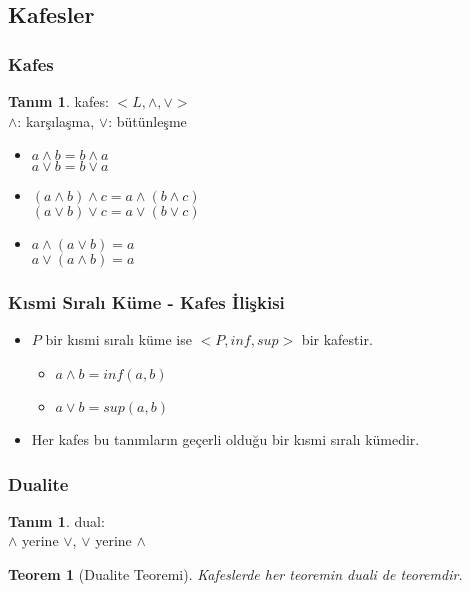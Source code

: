 \documentclass[dvipsnames]{beamer}
\theoremstyle{definition}
\newtheorem{tanim}[theorem]{Tanım}
\theoremstyle{example}
\theoremstyle{plain}
\newtheorem{teorem}[theorem]{Teorem}
\begin{document}
\subsection{Kafesler}

\begin{frame}
  \frametitle{Kafes}

  \begin{tanim}
    \alert{kafes}: $<L,\wedge,\vee>$\\
    $\wedge$: karşılaşma, $\vee$: bütünleşme

    \pause
    \begin{itemize}
      \item $a \wedge b = b \wedge a$\\
        $a \vee b = b \vee a$
      \item$(a \wedge b) \wedge c = a \wedge (b \wedge c)$\\
        $(a \vee b) \vee c = a \vee (b \vee c)$
      \item $a \wedge (a \vee b) = a$\\
        $a \vee (a \wedge b) = a$
    \end{itemize}
  \end{tanim}
\end{frame}

\begin{frame}
  \frametitle{Kısmi Sıralı Küme - Kafes İlişkisi}

  \begin{itemize}
    \item $P$ bir kısmi sıralı küme ise $<P,inf,sup>$ bir kafestir.
    \begin{itemize}
      \item $a \wedge b = inf(a,b)$
      \item $a \vee b = sup(a,b)$
    \end{itemize}

    \pause
    \medskip
    \item Her kafes bu tanımların geçerli olduğu bir kısmi sıralı kümedir.
  \end{itemize}
\end{frame}

\begin{frame}
  \frametitle{Dualite}

  \begin{tanim}
    \alert{dual}:\\
    $\wedge$ yerine $\vee$, $\vee$ yerine $\wedge$
  \end{tanim}

  \pause
  \begin{teorem}[Dualite Teoremi]
    Kafeslerde her teoremin duali de teoremdir.
  \end{teorem}
\end{frame}
\end{document}
